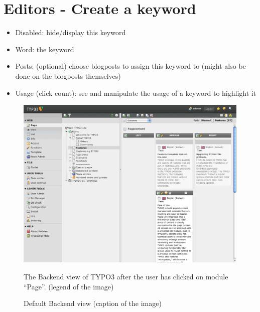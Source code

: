 \documentclass[a4paper,10pt,english]{sphinxmanual}
\begin{document}
\section{Editors - Create a keyword}
\label{UsersManual/Index:editors-create-a-keyword}\begin{itemize}
\item {} 
Disabled: hide/display this keyword

\item {} 
Word: the keyword

\item {} 
Posts: (optional) choose blogposts to assign this keyword to (might also be done on the blogposts themselves)

\item {} 
Usage (click count): see and manipulate the usage of a keyword to highlight it

\end{itemize}
\begin{figure}[htbp]
\centering
\capstart

\includegraphics{BackendView.png}
\caption{Default Backend view (caption of the image)}{\small 
The Backend view of TYPO3 after the user has clicked on module ``Page''. (legend of the image)
}\end{figure}
\end{document}
